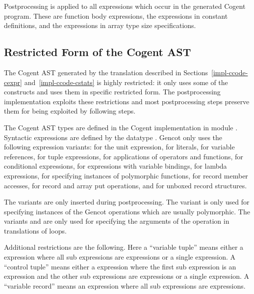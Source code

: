Postprocessing is applied to all expressions which occur in the generated Cogent program. These are function 
body expressions, the expressions in constant definitions, and the expressions in array type size specifications.

\subsection{Restricted Form of the Cogent AST}
\label{impl-post-ast}

The Cogent AST generated by the translation described in Sections~\ref{impl-ccode-cexpr} and~\ref{impl-ccode-cstats}
is highly restricted: it only uses some of the constructs and uses them in specific restricted form. The postprocessing
implementation exploits these restrictions and most postprocessing steps preserve them for being exploited by following
steps.

The Cogent AST types are defined in the Cogent implementation in module . Syntactic expressions
are defined by the datatype . Gencot only uses the following expression variants:  for the unit
expression,  for literals,  for variable references, 
for tuple expressions,  for applications of operators and functions,  for conditional
expressions,  for expressions with variable bindings,  for lambda expressions,  for
specifying instances of polymorphic functions,  for record member accesses,  for record
and array put operations, and  for unboxed record structures.

The variants  are only inserted during postprocessing. The variant  is only
used for specifying instances of the Gencot operations which are usually polymorphic. The variants 
and  are only used for specifying the arguments of the  operation in translations of loops.

Additional restrictions are the following. Here a ``variable tuple'' means either a  expression where all
sub expressions are  expressions or a single  expression. A ``control tuple'' means either a
 expression where the first sub expression is an  expression and the other sub expressions
are  expressions or a single  expression. A ``variable record'' means an 
expression where all sub expressions are  expressions.

